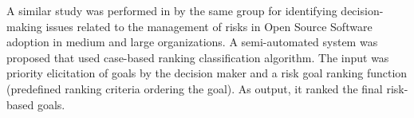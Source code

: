 A similar study was performed in \cite{7320432} by the same group
\cite{PAvesani} for identifying decision-making issues related to the
management of risks in Open Source Software adoption in medium and large
organizations. A semi-automated system was proposed that used case-based
ranking classification algorithm. The input was priority elicitation of goals by
the decision maker and a risk goal ranking function (predefined ranking criteria
ordering the goal). As output, it ranked the final risk-based
goals.



